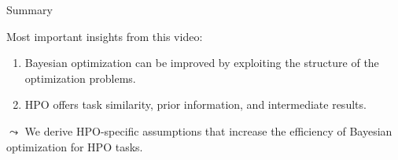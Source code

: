\documentclass[main]{subfiles}
\begin{document}
\begin{frame}{Summary} 

Most important insights from this video:
\pause

\begin{enumerate}
    \item Bayesian optimization can be improved by exploiting the structure of the optimization problems.
    \pause
    \item HPO offers task similarity, prior information, and intermediate results.
\end{enumerate}
\pause

$\leadsto$ We derive HPO-specific assumptions that increase the efficiency of Bayesian optimization for HPO tasks.

\end{frame}
\end{document}
